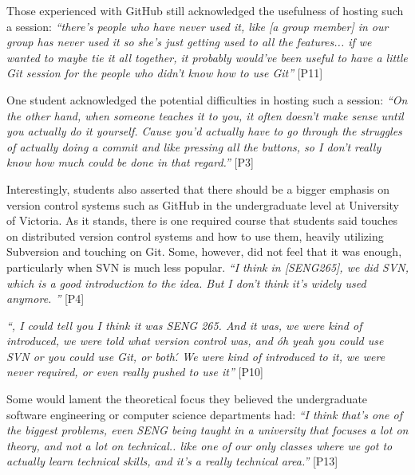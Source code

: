 Those experienced with GitHub still acknowledged the usefulness of hosting such a session: \textit{``there's people who have never used it, like [a group member] in our group has never used it so she's just getting used to all the features... if we wanted to maybe tie it all together, it probably would've been useful to have a little Git session for the people who didn't know how to use Git''} [P11]


One student acknowledged the potential difficulties in hosting such a session: \textit{``On the other hand, when someone teaches it to you, it often doesn't make sense until you actually do it yourself. Cause you'd actually have to go through the struggles of actually doing a commit and like pressing all the buttons, so I don't really know how much could be done in that regard.''} [P3]

Interestingly, students also asserted that there should be a bigger emphasis on version control systems such as GitHub in the undergraduate level at University of Victoria. As it stands, there is one required course that students said touches on distributed version control systems and how to use them, heavily utilizing Subversion and touching on Git. Some, however, did not feel that it was enough, particularly when SVN is much less popular. \textit{``I think in [SENG265], we did SVN, which is a good introduction to the idea. But I don't think it's widely used anymore. ''} [P4]

\textit{``, I could tell you I think it was SENG 265. And it was, we were kind of introduced, we were told what version control was, and \'oh yeah you could use SVN or you could use Git, or both\'. We were kind of introduced to it, we were never required, or even really pushed to use it''} [P10]

Some would lament the theoretical focus they believed the undergraduate software engineering or computer science departments had: \textit{``I think that's one of the biggest problems, even SENG being taught in a university that focuses a lot on theory, and not a lot on technical.. like one of our only classes where we got to actually learn technical skills, and it's a really technical area.''} [P13]

